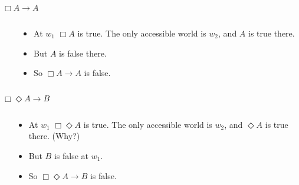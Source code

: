 \documentclass[
  14pt,
  letterpaper,
  ignorenonframetext,
  aspectratio=169,
  handout]{beamer}
\begin{document}
\begin{frame}{\(\Box A \rightarrow A\)}
\protect\hypertarget{box-a-rightarrow-a}{}
\begin{columns}
    \begin{column}{0.45\textwidth}
    \end{column}
    \begin{column}{0.5\textwidth}
    \begin{itemize}
    \item At $w_1$ $\Box A$ is true. The only accessible world is $w_2$, and $A$ is true there.
    \item But $A$ is false there.
    \item So $\Box A \rightarrow A$ is false.
    \end{itemize}
  \end{column}
\end{columns}
\end{frame}

\begin{frame}{\(\Box \Diamond A \rightarrow B\)}
\protect\hypertarget{box-diamond-a-rightarrow-b}{}
\begin{columns}
    \begin{column}{0.45\textwidth}
    \end{column}
    \begin{column}{0.5\textwidth}
    \begin{itemize}
    \item At $w_1$ $\Box \Diamond A$ is true. The only accessible world is $w_2$, and $\Diamond A$ is true there. (Why?)
    \item But $B$ is false at $w_1$.
    \item So $\Box \Diamond A \rightarrow B$ is false.
    \end{itemize}
  \end{column}
\end{columns}
\end{frame}
\end{document}
